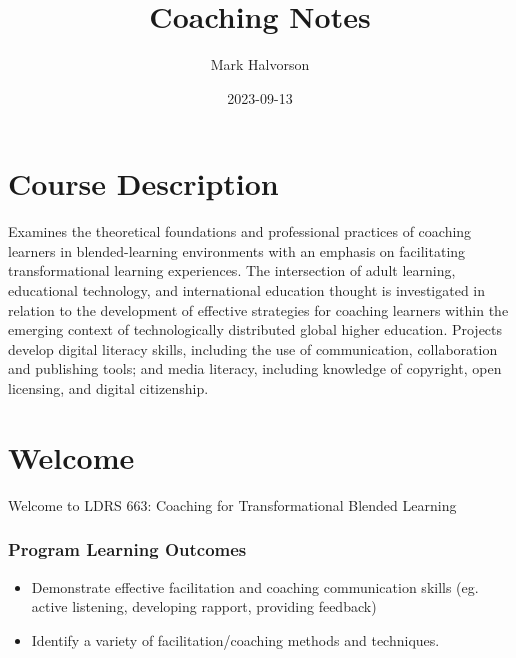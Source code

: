 \documentclass[
]{book}
\title{Coaching Notes}
\author{Mark Halvorson}
\date{2023-09-13}
\providecommand{\tightlist}{%
  \setlength{\itemsep}{0pt}\setlength{\parskip}{0pt}}
\begin{document}
\maketitle

{
\setcounter{tocdepth}{1}
\tableofcontents
}
\hypertarget{course-description}{%
\chapter*{Course Description}\label{course-description}}

Examines the theoretical foundations and professional practices of coaching learners in blended-learning environments with an emphasis on facilitating transformational learning experiences. The intersection of adult learning, educational technology, and international education thought is investigated in relation to the development of effective strategies for coaching learners within the emerging context of technologically distributed global higher education. Projects develop digital literacy skills, including the use of communication, collaboration and publishing tools; and media literacy, including knowledge of copyright, open licensing, and digital citizenship.

\hypertarget{welcome}{%
\chapter*{Welcome}\label{welcome}}

Welcome to LDRS 663: Coaching for Transformational Blended Learning

\hypertarget{program-learning-outcomes}{%
\subsection*{Program Learning Outcomes}\label{program-learning-outcomes}}

\begin{itemize}
\tightlist
\item
  Demonstrate effective facilitation and coaching communication skills (eg. active listening, developing rapport, providing feedback)\\
\item
  Identify a variety of facilitation/coaching methods and techniques.
\end{itemize}
\end{document}
